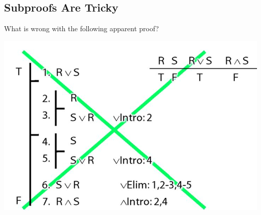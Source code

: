 \documentclass[12pt]{extarticle}
\begin{document}
\begin{multicols*}{3}
\vfill
\columnbreak
 
\section{Subproofs Are Tricky}
 
What is wrong with the following apparent proof?
 
\begin{center}
\includegraphics[scale=0.3]{img/unit_224_subproofs_tricky.png}
\end{center}

 


\end{multicols*}
\end{document}
